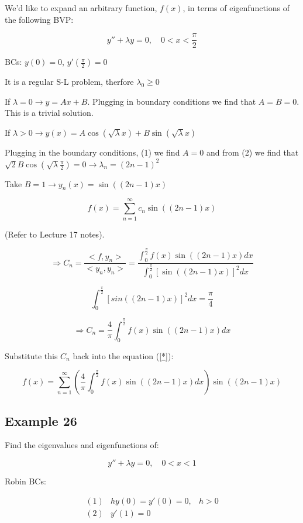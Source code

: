\documentclass{article}
\begin{document}
We'd like to expand an arbitrary function, $f(x)$, in terms of eigenfunctions of the following BVP:

$$y'' + \lambda y = 0, \quad 0 < x < \frac{\pi}{2}$$

BCs: $y(0) = 0$, $y' (\frac{\pi}{2}) = 0$

It is a regular S-L problem, therfore $\lambda_0 \geq 0$

If $\lambda = 0 \to y = Ax + B$. Plugging in boundary conditions we find that $A = B = 0$. This is a trivial solution. 

If $\lambda > 0 \to y(x) = A \cos (\sqrt{\lambda} x) + B \sin (\sqrt{\lambda} x)$

Plugging in the boundary conditions, (1) we find $A = 0$ and from (2) we find that $\sqrt{2} B \cos (\sqrt{\lambda} \frac{\pi}{2}) = 0 \to \lambda_n = (2n-1)^2$

Take $B = 1 \to y_n(x) = \sin \left( (2n-1) x \right)$

\begin{equation}
    \label{*}
    f(x) = \sum_{n=1}^\infty c_n \sin \left( (2n-1) x \right)
\end{equation}


(Refer to Lecture 17 notes). 

$$\Rightarrow C_n = \frac{<f, y_n>}{<y_n, y_n>} = \frac{\int_0^{\frac{\pi}{2}} f(x) \sin ((2n-1)x) dx}{\int_0^{\frac{\pi}{2}} \left[ \sin \left( (2n-1) x \right) \right]^2 dx}$$

$$\int_0^{\frac{\pi}{2}} \left[ sin \left( (2n-1) x \right) \right]^2 dx = \frac{\pi}{4}$$

$$\Rightarrow C_n = \frac{4}{\pi} \int_0^{\frac{\pi}{2}} f(x) \sin ((2n-1)x) dx$$

Substitute this $C_n$ back into the equation (\ref{*}):

$$f(x) = \sum_{n=1}^\infty \left( \frac{4}{\pi} \int_0^{\frac{\pi}{2}} f(x) \sin ((2n-1)x) dx \right) \sin \left( (2n-1) x \right)$$

\subsection{Example 26}

Find the eigenvalues and eigenfunctions of:

$$y'' + \lambda y = 0, \quad 0 < x < 1$$

Robin BCs:

$$\begin{matrix} (1) & h y(0) = y'(0) = 0, & h > 0 \\ (2) & y'(1) = 0 \end{matrix}$$
\end{document}
